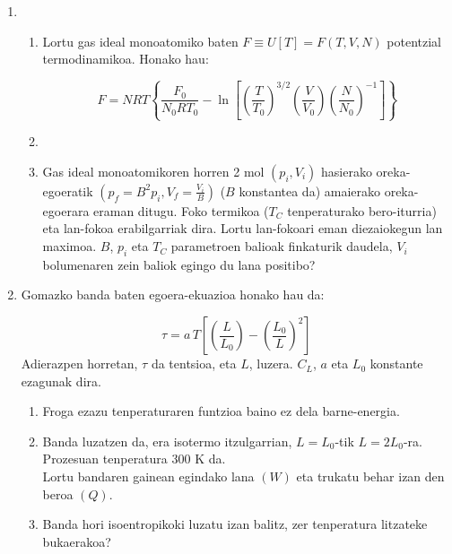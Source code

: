 \documentclass[10pt]{article}              %
\begin{document}
\begin{enumerate}
\vspace{1.25cm}

\item 
\begin{enumerate}
\item Lortu gas ideal monoatomiko baten $F\equiv U\left[T\right]=F\left(T,V,N\right)$ potentzial termodinamikoa. Honako hau:  

$$F = N R T \left\{ \frac {F_{0}}{N_{0}RT_{0}} - \ln \left[ \left( \frac {T}{T_{0}} \right) ^ {3/2} \left( \frac {V}{V_{0}} \right) \left(\frac{N}{N_{0}} \right)^{-1} \right] \right\}$$

\item[]

\item Gas ideal monoatomikoren horren 2 mol $(p_{i}, V_{i})$ hasierako oreka-egoeratik $(p_{f}=B^{2}p_{i}, V_{f}=\frac{V_{i}}{B})$ ($B$ konstantea da) amaierako oreka-egoerara eraman ditugu. Foko termikoa ($T_{C}$ tenperaturako bero-iturria) eta lan-fokoa erabilgarriak dira. Lortu lan-fokoari eman diezaiokegun lan maximoa. $B$, $p_{i}$ eta $T_{C}$ parametroen balioak finkaturik daudela, $V_{i}$ bolumenaren zein baliok egingo du lana positibo?
\end{enumerate}

\vspace{1.25cm}

\item Gomazko banda baten egoera-ekuazioa honako hau da:

$$ \tau = a\, T \left[ \left(\frac{L}{L_{0}}\right) - \left(\frac{L_{0}}{L}\right)^{2} \right]$$
Adierazpen horretan, $\tau$ da tentsioa, eta $L$, luzera. $C_{L}$, $a$ eta $L_{0}$ konstante ezagunak dira.
\begin{enumerate}
\item Froga ezazu tenperaturaren funtzioa baino ez dela barne-energia.
\item Banda luzatzen da, era isotermo itzulgarrian, $L = L_{0}$-tik $L = 2L_{0}$-ra.\\
Prozesuan tenperatura 300 K da.\\
Lortu bandaren gainean egindako lana $(W)$ eta trukatu behar izan den beroa $(Q)$.
\item Banda hori isoentropikoki luzatu izan balitz, zer tenperatura litzateke bukaerakoa?
\end{enumerate}

\vspace{5cm}


\end{enumerate}
\end{document}
